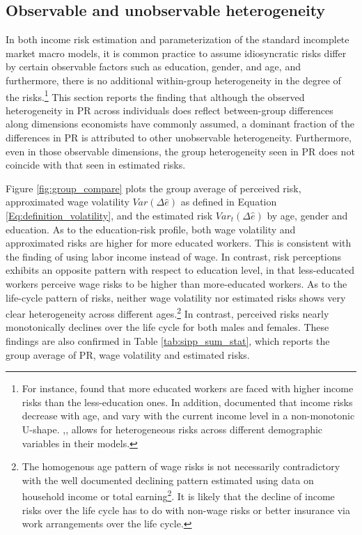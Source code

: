 
\hypertarget{cross-sectional-heterogeneity}{%
\subsection{Observable and unobservable
heterogeneity}\label{cross-sectional-heterogeneity}}

In both income risk estimation and parameterization of the standard incomplete market macro models, it is common practice to assume idiosyncratic risks differ by certain observable factors such as education, gender, and age, and furthermore, there is no additional within-group heterogeneity in the degree of the risks.\footnote{For instance, \cite{meghir2004income} found that more educated workers are faced with higher income risks than the less-education ones. In addition, \cite{sabelhaus2010great, bloom2018great} documented that income risks decrease with age, and vary with the current income level in a non-monotonic U-shape. \cite{cagetti2003wealth},\cite{blundell_consumption_2008}, \cite{carroll2017distribution} allows for heterogeneous risks across different demographic variables in their models.} This section reports the finding that although the observed heterogeneity in PR across individuals does reflect between-group differences along dimensions economists have commonly assumed, a dominant fraction of the differences in PR is attributed to other unobservable heterogeneity. Furthermore, even in those observable dimensions, the group heterogeneity seen in PR does not coincide with that seen in estimated risks.


Figure
\ref{fig:group_compare} plots the group average of perceived risk, approximated wage volatility $Var(\Delta \hat e)$ as defined in Equation \ref{Eq:definition_volatility}, and the estimated risk $Var_t(\Delta \hat e)$ by age, gender and education. As to the education-risk profile, both wage volatility and approximated risks are higher for more educated workers. This is consistent with the finding of \cite{meghir2004income} using labor income instead of wage. In contrast, risk perceptions exhibits an opposite pattern with respect to education level, in that less-educated workers perceive wage risks to be higher than more-educated workers. As to the life-cycle pattern of risks, neither wage volatility nor estimated risks shows very clear heterogeneity across different ages.\footnote{The homogenous age pattern of wage risks is not necessarily contradictory with the well documented declining pattern estimated using data on household income or total earning\footnote{For instance, \cite{cagetti2003wealth}, \cite{sabelhaus2010great}, etc.}. It is likely that the decline of income risks over the life cycle has to do with non-wage risks or better insurance via work arrangements over the life cycle. } In contrast, perceived risks nearly monotonically declines over the life cycle for both males and females. These findings are also confirmed in Table \ref{tab:sipp_sum_stat}, which reports the group average of PR, wage volatility and estimated risks. 

